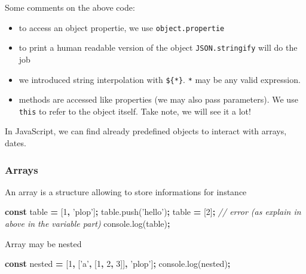 \documentclass[]{book}
\newenvironment{Shaded}{\begin{snugshade}}{\end{snugshade}}
\newcommand{\AttributeTok}[1]{\textcolor[rgb]{0.77,0.63,0.00}{#1}}
\newcommand{\CommentTok}[1]{\textcolor[rgb]{0.56,0.35,0.01}{\textit{#1}}}
\newcommand{\DecValTok}[1]{\textcolor[rgb]{0.00,0.00,0.81}{#1}}
\newcommand{\KeywordTok}[1]{\textcolor[rgb]{0.13,0.29,0.53}{\textbf{#1}}}
\newcommand{\NormalTok}[1]{#1}
\newcommand{\OperatorTok}[1]{\textcolor[rgb]{0.81,0.36,0.00}{\textbf{#1}}}
\newcommand{\StringTok}[1]{\textcolor[rgb]{0.31,0.60,0.02}{#1}}
\newcommand{\VariableTok}[1]{\textcolor[rgb]{0.00,0.00,0.00}{#1}}
\providecommand{\tightlist}{%
  \setlength{\itemsep}{0pt}\setlength{\parskip}{0pt}}
\begin{document}
Some comments on the above code:

\begin{itemize}
\tightlist
\item
  to access an object propertie, we use \texttt{object.propertie}
\item
  to print a human readable version of the object \texttt{JSON.stringify} will do the job
\item
  we introduced string interpolation with \texttt{\$\{*\}}. \texttt{*} may be any valid expression.
\item
  methods are accessed like properties (we may also pass parameters). We use \texttt{this} to refer to the object itself. Take note, we will see it a lot!
\end{itemize}

In JavaScript, we can find already predefined objects to interact with arrays, dates.

\hypertarget{arrays}{%
\subsubsection{Arrays}\label{arrays}}

An array is a structure allowing to store informations for instance

\begin{Shaded}
\begin{Highlighting}[]
\KeywordTok{const}\NormalTok{ table }\OperatorTok{=}\NormalTok{ [}\DecValTok{1}\OperatorTok{,} \StringTok{'plop'}\NormalTok{]}\OperatorTok{;}
\VariableTok{table}\NormalTok{.}\AttributeTok{push}\NormalTok{(}\StringTok{'hello'}\NormalTok{)}\OperatorTok{;}
\NormalTok{table }\OperatorTok{=}\NormalTok{ [}\DecValTok{2}\NormalTok{]}\OperatorTok{;} \CommentTok{// error (as explain in above in the variable part)}
\VariableTok{console}\NormalTok{.}\AttributeTok{log}\NormalTok{(table)}\OperatorTok{;}
\end{Highlighting}
\end{Shaded}

Array may be nested

\begin{Shaded}
\begin{Highlighting}[]
\KeywordTok{const}\NormalTok{ nested }\OperatorTok{=}\NormalTok{ [}\DecValTok{1}\OperatorTok{,}\NormalTok{ [}\StringTok{'a'}\OperatorTok{,}\NormalTok{ [}\DecValTok{1}\OperatorTok{,} \DecValTok{2}\OperatorTok{,} \DecValTok{3}\NormalTok{]]}\OperatorTok{,} \StringTok{'plop'}\NormalTok{]}\OperatorTok{;}
\VariableTok{console}\NormalTok{.}\AttributeTok{log}\NormalTok{(nested)}\OperatorTok{;}
\end{Highlighting}
\end{Shaded}
\end{document}
